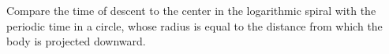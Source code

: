 Compare the time of descent to the center in the logarithmic spiral
with the periodic time in a circle, whose radius is equal to 
the distance from which the body is projected downward.
